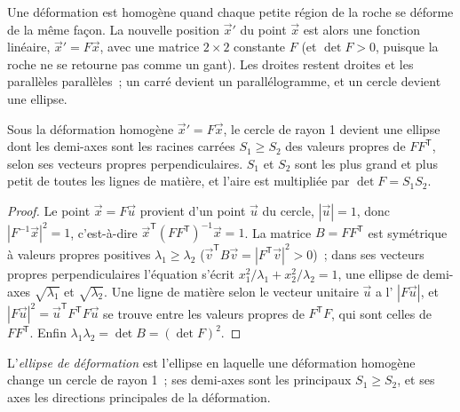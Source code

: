 Une déformation est homogène quand chaque petite région de la roche se déforme de la
même façon. La nouvelle position $\vec x'$ du point $\vec x$ est alors une fonction
linéaire, $\vec x' = F\vec x$, avec une matrice $2\times2$ constante $F$ (et
$\det F > 0$, puisque la roche ne se retourne pas comme un gant). Les droites restent
droites et les parallèles parallèles~; un carré devient un parallélogramme, et un
cercle devient une ellipse.

\begin{proposition}\label{prop:b1:stress-strain-rheology:ellipse}
Sous la déformation homogène $\vec x' = F\vec x$, le cercle de rayon 1
devient une ellipse dont les demi-axes sont les racines carrées $S_1 \ge S_2$ des
valeurs propres de $FF^{\mathsf T}$, selon ses vecteurs propres perpendiculaires. $S_1$
et $S_2$ sont les plus grand et plus petit  de toutes les lignes de matière,
et l'aire est multipliée par $\det F = S_1S_2$.
\end{proposition}

\begin{proof}
Le point $\vec x = F\vec u$ provient d'un point $\vec u$ du cercle,
$|\vec u| = 1$, donc $|F^{-1}\vec x|^2 = 1$, c'est-à-dire
$\vec x^{\mathsf T}(FF^{\mathsf T})^{-1}\vec x = 1$. La matrice
$B = FF^{\mathsf T}$ est symétrique à valeurs propres positives $\lambda_1 \ge
\lambda_2$ ($\vec v^{\mathsf T}B\vec v = |F^{\mathsf T}\vec v|^2 > 0$)~; dans ses
vecteurs propres perpendiculaires l'équation s'écrit
$x_1^2/\lambda_1 + x_2^2/\lambda_2 = 1$, une ellipse de demi-axes
$\sqrt{\lambda_1}$ et $\sqrt{\lambda_2}$. Une ligne de matière selon le vecteur
unitaire $\vec u$ a l' $|F\vec u|$, et
$|F\vec u|^2 = \vec u^{\mathsf T}F^{\mathsf T}F\vec u$ se trouve entre les
valeurs propres de $F^{\mathsf T}F$, qui sont celles de $FF^{\mathsf T}$. Enfin
$\lambda_1\lambda_2 = \det B = (\det F)^2$.
\end{proof}

\begin{definition}\label{def:b1:stress-strain-rheology:strain-ellipse}
L'\emph{ellipse de déformation} est l'ellipse en laquelle une
déformation homogène change un cercle de rayon 1~; ses demi-axes sont les
 principaux $S_1 \ge S_2$, et ses axes les directions principales de
la déformation.
\end{definition}

